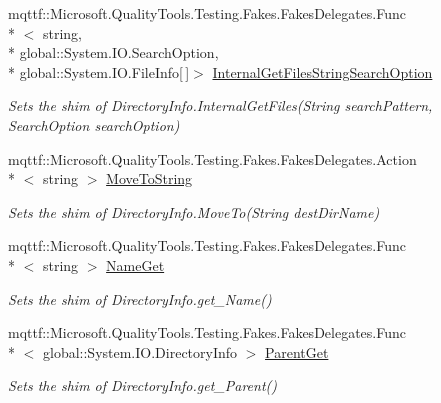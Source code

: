 \begin{DoxyCompactItemize}
mqttf\-::\-Microsoft.\-Quality\-Tools.\-Testing.\-Fakes.\-Fakes\-Delegates.\-Func\\*
$<$ string, \\*
global\-::\-System.\-I\-O.\-Search\-Option, \\*
global\-::\-System.\-I\-O.\-File\-Info\mbox{[}$\,$\mbox{]}$>$ \hyperlink{class_system_1_1_i_o_1_1_fakes_1_1_shim_directory_info_aed1245d2304da11f599aae1898507543}{Internal\-Get\-Files\-String\-Search\-Option}
\begin{DoxyCompactList}\small\item\em Sets the shim of Directory\-Info.\-Internal\-Get\-Files(\-String search\-Pattern, Search\-Option search\-Option)\end{DoxyCompactList}\item 
mqttf\-::\-Microsoft.\-Quality\-Tools.\-Testing.\-Fakes.\-Fakes\-Delegates.\-Action\\*
$<$ string $>$ \hyperlink{class_system_1_1_i_o_1_1_fakes_1_1_shim_directory_info_a4d7e3cffecc6c180fe695ee1b799b929}{Move\-To\-String}
\begin{DoxyCompactList}\small\item\em Sets the shim of Directory\-Info.\-Move\-To(\-String dest\-Dir\-Name)\end{DoxyCompactList}\item 
mqttf\-::\-Microsoft.\-Quality\-Tools.\-Testing.\-Fakes.\-Fakes\-Delegates.\-Func\\*
$<$ string $>$ \hyperlink{class_system_1_1_i_o_1_1_fakes_1_1_shim_directory_info_acd9a2f32100e70544b2795d931200a56}{Name\-Get}
\begin{DoxyCompactList}\small\item\em Sets the shim of Directory\-Info.\-get\-\_\-\-Name()\end{DoxyCompactList}\item 
mqttf\-::\-Microsoft.\-Quality\-Tools.\-Testing.\-Fakes.\-Fakes\-Delegates.\-Func\\*
$<$ global\-::\-System.\-I\-O.\-Directory\-Info $>$ \hyperlink{class_system_1_1_i_o_1_1_fakes_1_1_shim_directory_info_a1203aa69d28337ddda9522cad01c3fdf}{Parent\-Get}
\begin{DoxyCompactList}\small\item\em Sets the shim of Directory\-Info.\-get\-\_\-\-Parent()\end{DoxyCompactList}\item 

\end{DoxyCompactItemize}
